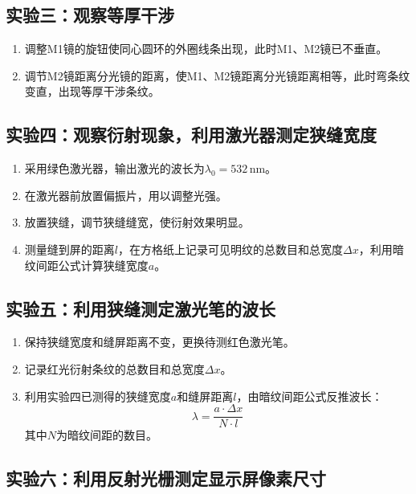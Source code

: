 \documentclass[UTF8]{article}
\begin{document}
\subsection{实验三：观察等厚干涉}

\begin{enumerate}
    \item 调整M1镜的旋钮使同心圆环的外圈线条出现，此时M1、M2镜已不垂直。
    \item 调节M2镜距离分光镜的距离，使M1、M2镜距离分光镜距离相等，此时弯条纹变直，出现等厚干涉条纹。
\end{enumerate}

\subsection{实验四：观察衍射现象，利用激光器测定狭缝宽度}

\begin{enumerate}
    \item 采用绿色激光器，输出激光的波长为$\lambda_0 = 532\,\mathrm{nm}$。
    \item 在激光器前放置偏振片，用以调整光强。
    \item 放置狭缝，调节狭缝缝宽，使衍射效果明显。
    \item 测量缝到屏的距离$l$，在方格纸上记录可见明纹的总数目和总宽度$\Delta x$，利用暗纹间距公式计算狭缝宽度$a$。
\end{enumerate}

\subsection{实验五：利用狭缝测定激光笔的波长}

\begin{enumerate}
    \item 保持狭缝宽度和缝屏距离不变，更换待测红色激光笔。
    \item 记录红光衍射条纹的总数目和总宽度$\Delta x$。
    \item 利用实验四已测得的狭缝宽度$a$和缝屏距离$l$，由暗纹间距公式反推波长：
    \begin{equation}
        \lambda = \frac{a \cdot \Delta x}{N \cdot l}
    \end{equation}
    其中$N$为暗纹间距的数目。
\end{enumerate}

\subsection{实验六：利用反射光栅测定显示屏像素尺寸}
\end{document}
